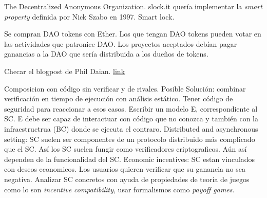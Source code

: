 The Decentralized Anonymous Organization. slock.it quería implementar
la {\it smart property}  definida por Nick Szabo en 1997. Smart lock.

Se compran DAO tokens con Ether. Los que tengan DAO tokens pueden
votar en las actividades que patronice DAO. Los proyectos aceptados
debían pagar ganancias a la DAO que sería distribuida a los dueños de tokens.

Checar el blogpost de Phil Daian. \href{http://hackingdistributed.com/2016/06/18/analysis-of-the-dao-exploit/}{link}





Composicion con código sin verificar y de rivales.
Posible Solución: combinar verificación en tiempo de ejecución con análisis estático.
                  Tener código de seguridad para reaccionar a esos casos.
                  Escribir un modelo E, correspondiente al SC. E debe ser capaz
                  de interactuar con código que no conozca y también con la
                  infraestructrua (BC) donde se ejecuta el contraro.
Distributed and asynchronous setting: SC suelen ser componentes de un protocolo
                                      distribuido más complicado que el SC. Así
                                      los SC suelen fungir como verificadores
                                      criptograficos. Aún así dependen de la
                                      funcionalidad del SC.
Economic incentives: SC estan vinculados con deseos economicos. Los usuarios quieren
                     verificar que su ganancia no sea negativa.  Analizar SC concretos
                     con ayuda de propiedades de teoría de juegos como lo son
                     {\it incentive compatibility}, usar formalismos como
                     {\it payoff games}. 
